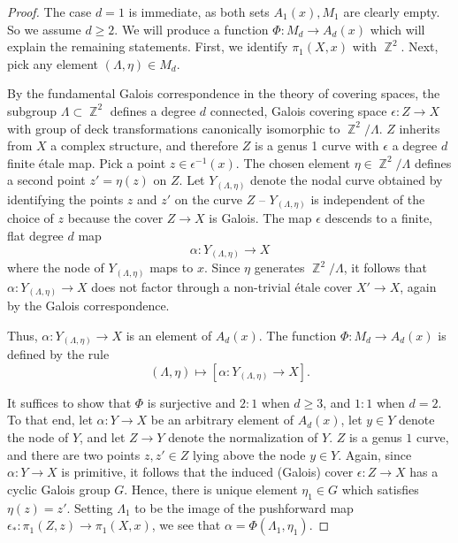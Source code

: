 \documentclass[reqno, 11pt]{amsart}
\DeclareMathOperator{\Z}{\mathbb{Z}}
\begin{document}
\begin{proof}
    The case $d=1$ is immediate, as both sets $A_{1}(x),M_{1}$ are clearly empty. So we assume $d \geq 2$. We will produce a function $\Phi: M_{d} \to A_{d}(x)$ which will explain the remaining statements. First, we identify $\pi_{1}(X,x)$ with $\Z^{2}$.  Next, pick any element $(\Lambda,\eta) \in M_{d}$.
    
    By the fundamental Galois correspondence in the theory of covering spaces, the subgroup $\Lambda \subset \Z^{2}$ defines a degree $d$ connected, Galois  covering space $\epsilon: Z \to X$ with group of deck transformations canonically isomorphic to $\Z^{2}/\Lambda$.  $Z$ inherits from $X$ a complex structure, and therefore $Z$ is a genus 1 curve with $\epsilon$ a degree $d$ finite \'etale map.  Pick a point $z \in \epsilon^{-1}(x)$. The chosen element $\eta \in \Z^{2}/\Lambda$ defines a second point $z' = \eta(z)$ on $Z$.  Let $Y_{(\Lambda,\eta)}$ denote the nodal curve obtained by identifying the points $z$ and $z'$ on the curve $Z$ -- $Y_{(\Lambda,\eta)}$ is independent of the choice of $z$ because the cover $Z \to X$ is Galois. The map $\epsilon$ descends to a finite, flat degree $d$ map \[\alpha:Y_{(\Lambda,\eta)} \to X\] where the node of $Y_{(\Lambda,\eta)}$ maps to $x$.  Since $\eta$ generates $\Z^{2}/\Lambda$, it follows that $\alpha: Y_{(\Lambda,\eta)} \to X$ does not factor through a non-trivial \'etale cover $X' \to X$, again by the Galois correspondence. 

    Thus, $\alpha: Y_{(\Lambda,\eta)} \to X$ is an element of $A_{d}(x)$. The function $\Phi: M_{d} \to A_{d}(x)$ is defined by the rule \[(\Lambda,\eta) \mapsto [\alpha:Y_{(\Lambda,\eta)} \to X].\] 
    
    It suffices to show that $\Phi$ is surjective and  $2:1$ when $d \geq 3$, and $1:1$ when $d=2$. To that end, let $\alpha: Y\to X$ be an arbitrary element of $A_{d}(x)$, let $y \in Y$ denote the node of $Y$, and let $Z \to Y$ denote the normalization of $Y$.  $Z$ is a genus $1$ curve, and there are two points $z, z' \in Z$ lying above the node $y \in Y$. Again, since $\alpha: Y \to X$ is primitive, it follows that the induced (Galois) cover $\epsilon: Z \to X$ has a cyclic Galois group $G$. Hence, there is unique element $\eta_{1} \in G$ which satisfies $\eta(z) = z'$. Setting $\Lambda_{1}$ to be the image of the pushforward map $\epsilon_{*}:\pi_{1}(Z,z) \to \pi_{1}(X,x)$, we see that $\alpha = \Phi(\Lambda_{1}, \eta_{1})$.  


\end{proof}
\end{document}
